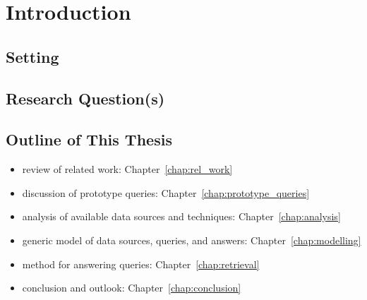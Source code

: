 \chapter{Introduction}
\label{chap:intro}

\section{Setting}
\label{sec:setting}



\section{Research Question(s)}
\label{sec:research_questions}



\section{Outline of This Thesis}
\label{sec:outline}

\begin{itemize}
  \item
    review of related work: Chapter~\ref{chap:rel_work}
  \item
    discussion of prototype queries: Chapter~\ref{chap:prototype_queries}
  \item
    analysis of available data sources and techniques: Chapter~\ref{chap:analysis}
  \item
    generic model of data sources, queries, and answers: Chapter~\ref{chap:modelling}
  \item
    method for answering queries: Chapter~\ref{chap:retrieval}
  \item
    conclusion and outlook: Chapter~\ref{chap:conclusion}
\end{itemize}


